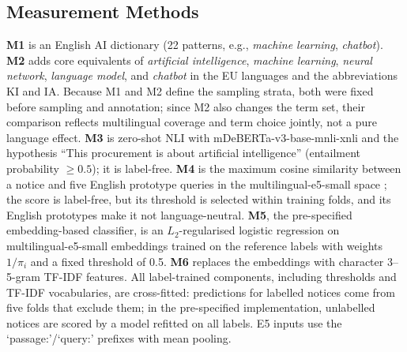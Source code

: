 \documentclass[runningheads]{llncs}
\begin{document}
\subsection{Measurement Methods}
\textbf{M1} is an English AI dictionary (22 patterns, e.g., \textit{machine learning}, \textit{chatbot}). \textbf{M2} adds core equivalents of \textit{artificial intelligence}, \textit{machine learning}, \textit{neural network}, \textit{language model}, and \textit{chatbot} in the EU languages and the abbreviations KI and IA. Because M1 and M2 define the sampling strata, both were fixed before sampling and annotation; since M2 also changes the term set, their comparison reflects multilingual coverage and term choice jointly, not a pure language effect. \textbf{M3} is zero-shot NLI with mDeBERTa-v3-base-mnli-xnli \cite{he2023,yin2019} and the hypothesis ``This procurement is about artificial intelligence'' (entailment probability $\ge 0.5$); it is label-free. \textbf{M4} is the maximum cosine similarity between a notice and five English prototype queries in the multilingual-e5-small space \cite{wang2024me5}; the score is label-free, but its threshold is selected within training folds, and its English prototypes make it not language-neutral. \textbf{M5}, the pre-specified embedding-based classifier, is an $L_2$-regularised logistic regression on multilingual-e5-small embeddings trained on the reference labels with weights $1/\pi_i$ and a fixed threshold of 0.5. \textbf{M6} replaces the embeddings with character 3--5-gram TF-IDF features. All label-trained components, including thresholds and TF-IDF vocabularies, are cross-fitted: predictions for labelled notices come from five folds that exclude them; in the pre-specified implementation, unlabelled notices are scored by a model refitted on all labels. E5 inputs use the `passage:'/`query:' prefixes with mean pooling.
\end{document}
